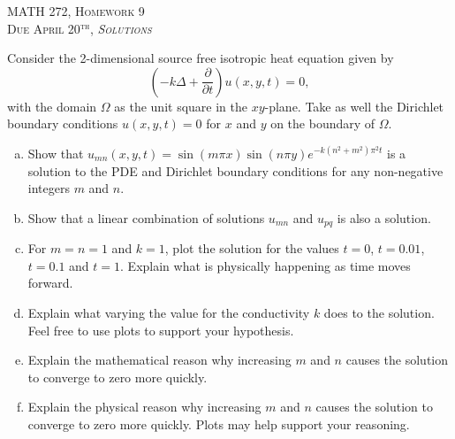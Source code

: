 \documentclass[12pt]{article} %
\begin{document}
\begin{center}
   \textsc{\large MATH 272, Homework 9}\\
   \textsc{Due April 20$^\textrm{th}$, \emph{Solutions}}
\end{center}
\vspace{.5cm}

\begin{problem}
    Consider the 2-dimensional source free isotropic heat equation given by
    \[
    \left( -k \Delta + \frac{\partial}{\partial t} \right) u(x,y,t) = 0,
    \]
    with the domain $\Omega$ as the unit square in the $xy$-plane. Take as well the Dirichlet boundary conditions $u(x,y,t)=0$ for $x$ and $y$ on the boundary of $\Omega$.
    \begin{enumerate}[(a)]
        \item Show that $u_{mn}(x,y,t)=\sin(m\pi x)\sin(n\pi y)e^{-k(n^2+m^2)\pi^2 t}$ is a solution to the PDE and Dirichlet boundary conditions for any non-negative integers $m$ and $n$.
        \item Show that a linear combination of solutions $u_{mn}$ and $u_{pq}$ is also a solution.
        \item For $m=n=1$ and $k=1$, plot the solution for the values $t=0$, $t=0.01$, $t=0.1$ and $t=1$.  Explain what is physically happening as time moves forward.
        \item Explain what varying the value for the conductivity $k$ does to the solution.  Feel free to use plots to support your hypothesis.
        \item Explain the mathematical reason why increasing $m$ and $n$ causes the solution to converge to zero more quickly.
        \item Explain the physical reason why increasing $m$ and $n$ causes the solution to converge to zero more quickly. Plots may help support your reasoning.
    \end{enumerate}
\end{problem}
\end{document}
